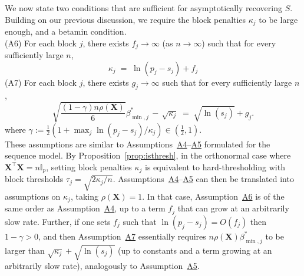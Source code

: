 \documentclass[bj,authoryear]{imsart}
\theoremstyle{plain}
\newcommand{\david}[1]{{\small{\color{blue} \sf $\heartsuit$ [David: #1]}}}
\newcommand{\I}{\mathbb{I}}
\newcommand{\bs}{\boldsymbol}
\begin{document}
We now state two conditions that are sufficient for asymptotically recovering $S$. 
Building on our previous discussion, we require the block penalties $\kappa_j$ to be large enough,  
and a betamin condition. \\[5pt] 
\hypertarget{lab:A6}{(A6)} \quad For each block $j$, there exists $f_j\to \infty$ (as $n\to \infty$) such that for every sufficiently large $n$,
\begin{equation*}
    \kappa_j \;=\;\ln(p_j-s_j) + f_j
\end{equation*} 
\hypertarget{lab:A7}{(A7)} \quad For each block $j$, there exists $g_j\to \infty$ such that for every sufficiently large $n$,
    \begin{equation*}
        \sqrt{\frac{(1-\gamma) n\rho(\bs X)}{6}}{\beta_{\min,j}^*} \,- \,\sqrt{\kappa_j} \;=\; \sqrt{\ln(s_j)} + g_j .
    \end{equation*}
where $\gamma:=\tfrac12(1+\max_j\ln(p_j-s_j)/\kappa_j)\in (\tfrac12,1)$.\\[5pt] 
These assumptions are similar to Assumptions~\hyperlink{lab:A4}{A4}--\hyperlink{lab:A5}{A5} formulated for the sequence model.
 By Proposition~\ref{prop:isthresh}, in the orthonormal 
 case where $\bs X^{\top}\bs X=n\I_p$, setting block penalties $\kappa_j$ 
 is equivalent to hard-thresholding with block thresholds $\tau_j=\sqrt{2 \kappa_j/n}$.
 Assumptions~\hyperlink{lab:A4}{A4}--\hyperlink{lab:A5}{A5} can then be translated into assumptions on $\kappa_j$, taking $\rho(\bs X)=1$. In that case, Assumption~\hyperlink{lab:A6}{A6} is of the same order as Assumption~\hyperlink{lab:A4}{A4}, up to a term $f_j$ that can grow at an arbitrarily slow rate. %
 Further, if one sets $f_j$ such that $\ln(p_j-s_j)= O(f_j)$ then $1-\gamma > 0$, and then Assumption~\hyperlink{lab:A7}{A7} essentially requires $n \rho(\bs X) \beta_{\min,j}^*$ to be larger than $\sqrt{\kappa_j} + \sqrt{\ln(s_j)}$ (up to constants and a term growing at an arbitrarily slow rate), analogously to Assumption~\hyperlink{lab:A5}{A5}.
\end{document}
